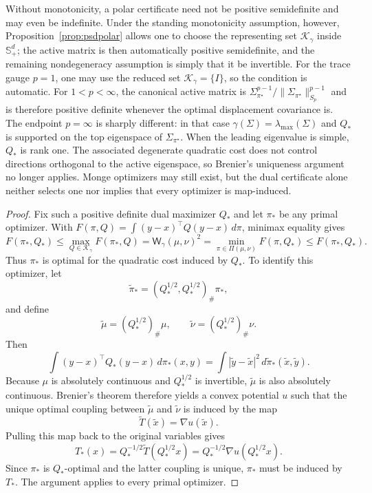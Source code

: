 \documentclass{article}
\newcommand{\Wg}{\mathsf{W}_{\gamma}}
\newcommand{\abs}[1]{\left\lvert #1 \right\rvert}
\newcommand{\cK}{\mathcal K_\gamma}
\begin{document}
Without monotonicity, a polar certificate need not be positive semidefinite
and may even be indefinite. Under the standing monotonicity assumption,
however,
Proposition~\ref{prop:psdpolar} allows one to choose the representing set
$\cK$ inside $\mathbb S_+^d$; the active matrix is then automatically positive
semidefinite, and the remaining nondegeneracy assumption is simply that it be
invertible. For the trace gauge $p=1$, one may use the reduced set
$\cK=\{I\}$, so the condition is automatic. For $1<p<\infty$, the canonical
active matrix is
$\Sigma_{\pi^\star}^{p-1}/\|\Sigma_{\pi^\star}\|_{S_p}^{p-1}$ and is therefore
positive definite whenever the optimal displacement covariance is. The
endpoint $p=\infty$ is sharply different: in that case
$\gamma(\Sigma)=\lambda_{\max}(\Sigma)$ and $Q_*$ is supported on the top
eigenspace of $\Sigma_{\pi^\star}$. When the leading eigenvalue is simple,
$Q_*$ is rank one. The associated degenerate quadratic cost does not control
directions orthogonal to the active eigenspace, so Brenier's uniqueness
argument no longer applies. Monge optimizers may still exist, but the dual
certificate alone neither selects one nor implies that every optimizer is
map-induced.

\begin{proof}
Fix such a positive definite dual maximizer $Q_*$ and let $\pi_*$ be any
primal optimizer. With
$F(\pi,Q)=\int(y-x)^\top Q(y-x)\,d\pi$, minimax equality gives
\[
 F(\pi_*,Q_*)
 \le \max_{Q\in\cK}F(\pi_*,Q)
 =\Wg(\mu,\nu)^2
 =\min_{\pi\in\Pi(\mu,\nu)}F(\pi,Q_*)
 \le F(\pi_*,Q_*).
\]
Thus $\pi_*$ is optimal for the quadratic cost induced by $Q_*$. To identify
this optimizer, let
$$
\widetilde\pi_*=(Q_*^{1/2},Q_*^{1/2})_\#\pi_*,
$$
and define
$$
\widetilde\mu=(Q_*^{1/2})_\#\mu,
\qquad
\widetilde\nu=(Q_*^{1/2})_\#\nu.
$$
Then
$$
\int (y-x)^\top Q_*(y-x)\,d\pi_*(x,y)
=
\int \abs{\tilde y-\tilde x}^2\,d\widetilde\pi_*(\tilde x,\tilde y).
$$
Because $\mu$ is absolutely continuous and $Q_*^{1/2}$ is invertible,
$\widetilde\mu$ is also absolutely continuous. Brenier's theorem therefore
yields a convex potential $u$ such that the unique optimal coupling between
$\widetilde\mu$ and $\widetilde\nu$ is induced by the map
$$
\widetilde T(\tilde x)=\nabla u(\tilde x).
$$
Pulling this map back to the original variables gives
$$
T_*(x)=Q_*^{-1/2}\widetilde T(Q_*^{1/2}x)=Q_*^{-1/2}\nabla u(Q_*^{1/2}x).
$$
Since $\pi_*$ is $Q_*$-optimal and the latter coupling is unique, $\pi_*$ must
be induced by $T_*$. The argument applies to every primal optimizer.
\end{proof}
\end{document}
